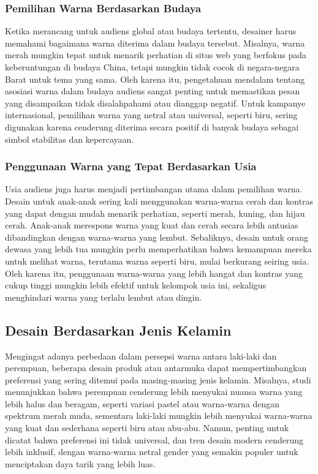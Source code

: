 \documentclass[a4paper]{article}
\begin{document}
\subsubsection{Pemilihan Warna Berdasarkan Budaya}
Ketika merancang untuk audiens global atau budaya tertentu, desainer harus memahami bagaimana warna diterima dalam budaya tersebut. Misalnya, warna merah mungkin tepat untuk menarik perhatian di situs web yang berfokus pada keberuntungan di budaya China, tetapi mungkin tidak cocok di negara-negara Barat untuk tema yang sama. Oleh karena itu, pengetahuan mendalam tentang asosiasi warna dalam budaya audiens sangat penting untuk memastikan pesan yang disampaikan tidak disalahpahami atau dianggap negatif. Untuk kampanye internasional, pemilihan warna yang netral atau universal, seperti biru, sering digunakan karena cenderung diterima secara positif di banyak budaya sebagai simbol stabilitas dan kepercayaan.

\subsubsection{Penggunaan Warna yang Tepat Berdasarkan Usia}
Usia audiens juga harus menjadi pertimbangan utama dalam pemilihan warna. Desain untuk anak-anak sering kali menggunakan warna-warna cerah dan kontras yang dapat dengan mudah menarik perhatian, seperti merah, kuning, dan hijau cerah. Anak-anak merespons warna yang kuat dan cerah secara lebih antusias dibandingkan dengan warna-warna yang lembut. Sebaliknya, desain untuk orang dewasa yang lebih tua mungkin perlu memperhatikan bahwa kemampuan mereka untuk melihat warna, terutama warna seperti biru, mulai berkurang seiring usia. Oleh karena itu, penggunaan warna-warna yang lebih hangat dan kontras yang cukup tinggi mungkin lebih efektif untuk kelompok usia ini, sekaligus menghindari warna yang terlalu lembut atau dingin.


\subsection{Desain Berdasarkan Jenis Kelamin}
Mengingat adanya perbedaan dalam persepsi warna antara laki-laki dan perempuan, beberapa desain produk atau antarmuka dapat mempertimbangkan preferensi yang sering ditemui pada masing-masing jenis kelamin. Misalnya, studi menunjukkan bahwa perempuan cenderung lebih menyukai nuansa warna yang lebih halus dan beragam, seperti variasi pastel atau warna-warna dengan spektrum merah muda, sementara laki-laki mungkin lebih menyukai warna-warna yang kuat dan sederhana seperti biru atau abu-abu. Namun, penting untuk dicatat bahwa preferensi ini tidak universal, dan tren desain modern cenderung lebih inklusif, dengan warna-warna netral gender yang semakin populer untuk menciptakan daya tarik yang lebih luas.
\end{document}
